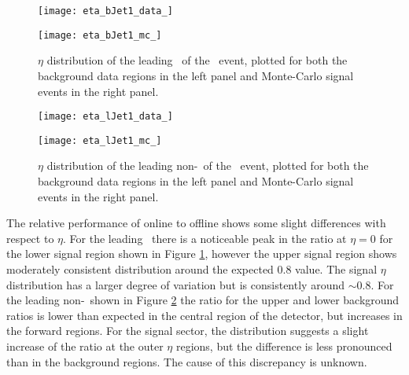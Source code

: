     \begin{figure}[h]
        \centering

        \begin{minipage}[h]{0.48\linewidth}
            \texttt{[image: eta\_bJet1\_data\_]}
        \end{minipage}
        \quad
        \begin{minipage}[h]{0.48\linewidth}
            \texttt{[image: eta\_bJet1\_mc\_]}
        \end{minipage}
        \caption[$\eta$ distribution of the leading \bjet\ of the \VBFHBB\ event]{$\eta$ distribution of the leading \bjet\ of the \VBFHBB\ event, plotted for both the background data regions in the left panel and Monte-Carlo signal events in the right panel.}
        \label{f:etab1}
    \end{figure}

    \begin{figure}[h]
        \centering
        \begin{minipage}[h]{0.48\linewidth}
            \texttt{[image: eta\_lJet1\_data\_]}
        \end{minipage}
        \quad
        \begin{minipage}[h]{0.48\linewidth}
            \texttt{[image: eta\_lJet1\_mc\_]}
        \end{minipage}
        \caption[$\eta$ distribution of the leading non-\bjet\ of the \VBFHBB\ event]{$\eta$ distribution of the leading non-\bjet\ of the \VBFHBB\ event, plotted for both the background data regions in the left panel and Monte-Carlo signal events in the right panel.}
        \label{f:etaj1}
    \end{figure}

    The relative performance of online to offline shows some slight differences with respect to $\eta$. For the leading \bjet\ there is a noticeable peak in the ratio at $\eta=0$ for the lower signal region shown in Figure \ref{f:etab1}, however the upper signal region shows moderately consistent distribution around the expected $0.8$ value. The signal $\eta$ distribution has a larger degree of variation but is consistently around $\sim0.8$. For the leading non-\bjet\ shown in Figure \ref{f:etaj1} the ratio for the upper and lower background ratios is lower than expected in the central region of the detector, but increases in the forward regions. For the signal sector, the distribution suggests a slight increase of the ratio at the outer $\eta$ regions, but the difference is less pronounced than in the background regions. The cause of this discrepancy is unknown.

